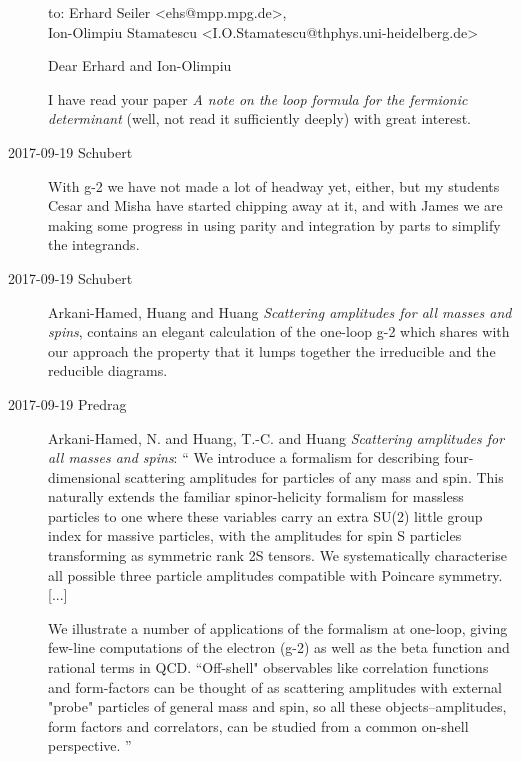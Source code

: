 \begin{description}
to: Erhard Seiler <ehs@mpp.mpg.de>,\\
    Ion-Olimpiu Stamatescu <I.O.Stamatescu@thphys.uni-heidelberg.de>

\bigskip

Dear Erhard and Ion-Olimpiu

I have read your paper
{\em A note on the loop formula for the fermionic determinant}
(well, not read it sufficiently deeply)
with great interest.

\item[2017-09-19 Schubert]
With g-2 we have not made a lot of headway yet, either, but my students Cesar
and Misha have started chipping away at it,  and with James we are making
some progress in using parity and integration by parts to simplify the
integrands.

\item[2017-09-19 Schubert]
Arkani-Hamed, Huang and Huang
{\em Scattering amplitudes for all masses and spins}, 
 contains an
elegant calculation of the one-loop g-2 which shares with our approach the
property that it lumps together the irreducible and the reducible diagrams.

\item[2017-09-19 Predrag]
Arkani-Hamed, N. and Huang, T.-C. and Huang
{\em Scattering amplitudes for all masses and spins}: ``
We introduce a formalism for describing four-dimensional scattering
amplitudes for particles of any mass and spin. This naturally extends the
familiar spinor-helicity formalism for massless particles to one where these
variables carry an extra SU(2) little group index for massive particles, with
the amplitudes for spin S particles transforming as symmetric rank 2S
tensors. We systematically characterise all possible three particle
amplitudes compatible with Poincare symmetry. [...]

We illustrate a number of
applications of the formalism at one-loop, giving few-line computations of
the electron (g-2) as well as the beta function and rational terms in QCD.
``Off-shell" observables like correlation functions and form-factors can be
thought of as scattering amplitudes with external "probe" particles of
general mass and spin, so all these objects--amplitudes, form factors and
correlators, can be studied from a common on-shell perspective.
''


\end{description}
